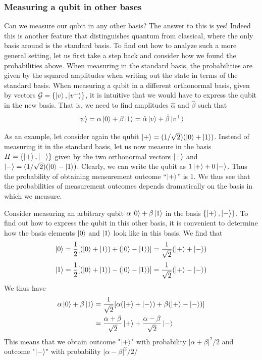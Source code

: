 \subsubsection{Measuring a qubit in other bases}
Can we measure our qubit in any other basis? The answer to this is yes! Indeed this is another
feature that distinguishes quantum from classical, where the only basis around is the standard basis.
To find out how to analyze such a more general setting, let us first take a step back and consider
how we found the probabilities above. When measuring in the standard basis, the probabilities are given by the squared amplitudes when writing out the state in terms of the standard basis. When
measuring a qubit in a different orthonormal basis, given by vectors $\mathcal{G}=\{\ket{v},\ket{v^\perp}\}$, it is intuitive that we would have to express the qubit in the new basis. That is, we need to find amplitudes $\hat{\alpha}$ and $\hat{\beta}$ such that
\[
\ket{\psi}=\alpha\ket{0}+\beta\ket{1}=\hat{\alpha} \ket{v}+\hat{\beta}\ket{v^{\perp}}
\]
\begin{example}
    As an example, let consider again the qubit $\ket{+}=(1/\sqrt{2})(\ket{0}+\ket{1})$. Instead
of measuring it in the standard basis, let us now measure in the basis $H = \{\ket{+},\ket{-}\}$ given by
the two orthonormal vectors $\ket{+}$ and $\ket{-} = (1/\sqrt{2})(\ket{0}-\ket{1})$. Clearly, we can write the qubit as $1\ket{+}+0\ket{-}$. Thus the probability of obtaining measurement outcome “$\ket{+}$” is 1. We thus see
that the probabilities of measurement outcomes depends dramatically on the basis in which we
measure. 
\end{example}

\begin{example}
    Consider measuring an arbitrary qubit $\alpha\ket{0}+\beta\ket{1}$ in the basis $\{\ket{+},\ket{-}\}$. To
find out how to express the qubit in this other basis, it is convenient to determine how the basis
elements $\ket{0}$ and $\ket{1}$ look like in this basis. We find that
\[
\ket{0}=\frac{1}{2}[(\ket{0}+\ket{1})+(\ket{0}-\ket{1})]=\frac{1}{\sqrt{2}}(\ket{+}+\ket{-})
\]
\[
\ket{1}=\frac{1}{2}[(\ket{0}+\ket{1})-(\ket{0}-\ket{1})]=\frac{1}{\sqrt{2}}(\ket{+}-\ket{-})
\]
We thus have
\begin{align*}
\alpha\ket{0}+\beta\ket{1}&=\frac{1}{\sqrt{2}}[\alpha(\ket{+}+\ket{-})+\beta(\ket{+}-\ket{-})]\\
&=\frac{\alpha+\beta}{\sqrt{2}}\ket{+}+\frac{\alpha-\beta}{\sqrt{2}}\ket{-}
\end{align*}
This means that we obtain outcome "$\ket{+}$" with probability $|\alpha+\beta|^2/2$ and outcome "$\ket{-}$" with probability $|\alpha-\beta|^2/2$/
\end{example}

